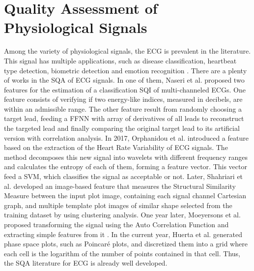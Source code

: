 \section{Quality Assessment of Physiological Signals}

Among the variety of physiological signals, the \gls{ECG} is prevalent in the literature. This signal has multiple applications, such as disease classification, heartbeat type detection, biometric detection and emotion recognition \cite{ecg-1}. There are a plenty of works in the \gls{SQA} of ECG signals. In one of them, Naseri et al. \cite{ecg-2} proposed two features for the estimation of a classification \gls{SQI} of multi-channeled \gls{ECG}s. One feature consists of verifying if two energy-like indices, measured in decibels, are within an admissible range. The other feature result from randomly choosing a target lead, feeding a \gls{FFNN} with array of derivatives of all leads to reconstruct the targeted lead and finally comparing the original target lead to its artificial version with correlation analysis. In 2017, Orphanidou et al. \cite{ecg-3} introduced a feature based on the extraction of the Heart Rate Variability of \gls{ECG} signals. The method decomposes this new signal into wavelets with different frequency ranges and calculates the entropy of each of them, forming a feature vector. This vector feed a \gls{SVM}, which classifies the signal as acceptable or not. Later, Shahriari et al. \cite{ecg-4} developed an image-based feature that measures the Structural Similarity Measure between the input plot image, containing each signal channel Cartesian graph, and multiple template plot images of similar shape selected from the training dataset by using clustering analysis. One year later, Moeyersons et al. \cite{ecg-5} proposed transforming the signal using the Auto Correlation Function and extracting simple features from it \cite{ecg-5}. In the current year, Huerta et al. \cite{ecg-6} generated phase space plots, such as Poincaré plots, and discretized them into a grid where each cell is the logarithm of the number of points contained in that cell. Thus, the \gls{SQA} literature for \gls{ECG} is already well developed.

